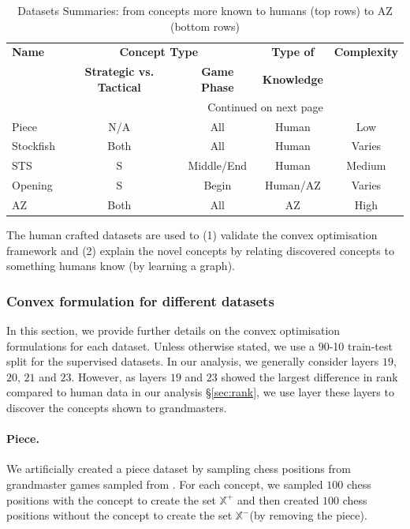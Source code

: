 \documentclass{article}
\def\Xset{\mathbb{X}}
\begin{document}
\begin{longtable}{l c c c c} 
\caption{Datasets Summaries: from concepts more known to humans (top rows) to AZ (bottom rows)}
\label{table:summary_dataset} \\ 
\toprule
\textbf{Name} &  \multicolumn{2}{c}{\textbf{Concept Type}} &  \textbf{Type of}  & \textbf{Complexity} \\  
& \textbf{Strategic vs. Tactical} & \textbf{Game Phase} &\textbf{Knowledge} &  \\ 
\midrule
\endhead
\midrule
\multicolumn{4}{r}{{Continued on next page}} \\
\midrule
\endfoot
\bottomrule
\endlastfoot
Piece  & N/A & All & Human & Low \\ 
Stockfish  & Both & All & Human & Varies \\ 
STS &  S & Middle/End & Human & Medium \\ 
Opening  & S & Begin & Human/AZ & Varies \\
AZ  & Both & All & AZ & High \\ 
\end{longtable}

The human crafted datasets are used to (1) validate the convex optimisation framework and (2) explain the novel concepts by relating discovered concepts to something humans know (by learning a graph). 

\subsubsection{Convex formulation for different datasets} \label{appendix:cp_formulations}

In this section, we provide further details on the convex optimisation formulations for each dataset. 
Unless otherwise stated, we use a 90-10 train-test split for the supervised datasets. 
In our analysis, we generally consider layers $19$, $20$, $21$ and $23$. However, as layers $19$ and $23$ showed the largest difference in rank compared to human data in our analysis \S\ref{sec:rank}, we use layer these layers to discover the concepts shown to grandmasters.

\paragraph{Piece.}
We artificially created a piece dataset by sampling chess positions from grandmaster games sampled from \cite{chessbase}. For each concept, we sampled $100$ chess positions with the concept to create the set $\Xset^{+}$ and then created $100$ chess positions without the concept to create the set $\Xset^{-}$(by removing the piece). 
\end{document}
